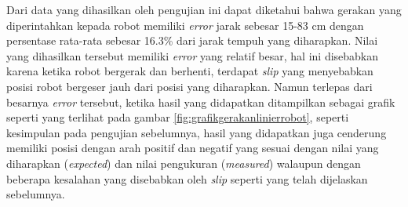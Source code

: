 

Dari data yang dihasilkan oleh pengujian ini dapat diketahui bahwa gerakan yang diperintahkan kepada robot memiliki \emph{error} jarak sebesar 15-83 cm dengan persentase rata-rata sebesar 16.3\% dari jarak tempuh yang diharapkan.
Nilai yang dihasilkan tersebut memiliki \emph{error} yang relatif besar,
  hal ini disebabkan karena ketika robot bergerak dan berhenti, terdapat \emph{slip} yang menyebabkan posisi robot bergeser jauh dari posisi yang diharapkan.
Namun terlepas dari besarnya \emph{error} tersebut,
  ketika hasil yang didapatkan ditampilkan sebagai grafik seperti yang terlihat pada gambar \ref{fig:grafikgerakanlinierrobot},
  seperti kesimpulan pada pengujian sebelumnya,
  hasil yang didapatkan juga cenderung memiliki posisi dengan arah positif dan negatif yang sesuai dengan nilai yang diharapkan (\emph{expected}) dan nilai pengukuran (\emph{measured}) walaupun dengan beberapa kesalahan yang disebabkan oleh \emph{slip} seperti yang telah dijelaskan sebelumnya.


